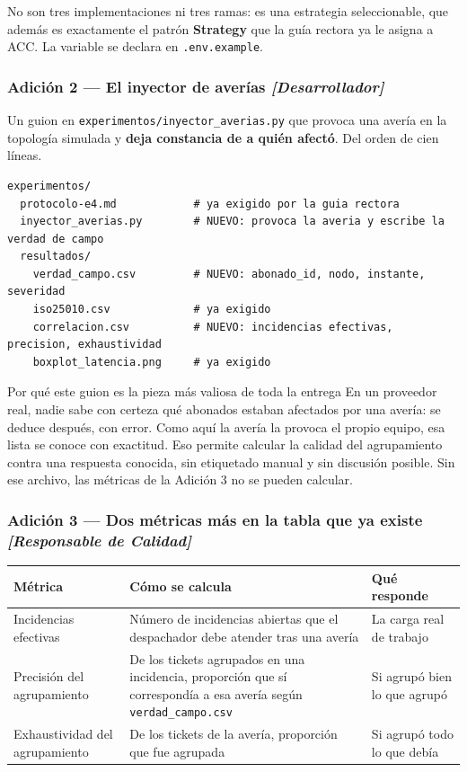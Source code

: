 \documentclass[11pt,a4paper]{article}
\begin{document}
No son tres implementaciones ni tres ramas: es una estrategia seleccionable, que además es exactamente el patrón \textbf{Strategy} que la guía rectora ya le asigna a ACC. La variable se declara en \texttt{.env.example}.

\subsubsection{Adición 2 --- El inyector de averías \emph{[Desarrollador]}}

Un guion en \texttt{experimentos/\allowbreak inyector\_averias.py} que provoca una avería en la topología simulada y \textbf{deja constancia de a quién afectó}. Del orden de cien líneas.

\begin{lstlisting}
experimentos/
  protocolo-e4.md            # ya exigido por la guia rectora
  inyector_averias.py        # NUEVO: provoca la averia y escribe la verdad de campo
  resultados/
    verdad_campo.csv         # NUEVO: abonado_id, nodo, instante, severidad
    iso25010.csv             # ya exigido
    correlacion.csv          # NUEVO: incidencias efectivas, precision, exhaustividad
    boxplot_latencia.png     # ya exigido
\end{lstlisting}

\begin{defBox}{Por qué este guion es la pieza más valiosa de toda la entrega}
	En un proveedor real, nadie sabe con certeza qué abonados estaban afectados por una avería: se deduce después, con error. Como aquí la avería la provoca el propio equipo, esa lista se conoce con exactitud. Eso permite calcular la calidad del agrupamiento contra una respuesta conocida, sin etiquetado manual y sin discusión posible. Sin ese archivo, las métricas de la Adición 3 no se pueden calcular.
\end{defBox}

\subsubsection{Adición 3 --- Dos métricas más en la tabla que ya existe \emph{[Responsable de Calidad]}}

\begin{center}
	\small
	\begin{tabular}{@{}p{4.0cm}p{6.4cm}p{4.6cm}@{}}
		\toprule
		\textbf{Métrica} & \textbf{Cómo se calcula} & \textbf{Qué responde} \\
		\midrule
		Incidencias efectivas & Número de incidencias abiertas que el despachador debe atender tras una avería & La carga real de trabajo \\
		\addlinespace
		Precisión del agrupamiento & De los tickets agrupados en una incidencia, proporción que sí correspondía a esa avería según \texttt{verdad\_campo.csv} & Si agrupó bien lo que agrupó \\
		\addlinespace
		Exhaustividad del agrupamiento & De los tickets de la avería, proporción que fue agrupada & Si agrupó todo lo que debía \\
		\bottomrule
	\end{tabular}
\end{center}
\end{document}
